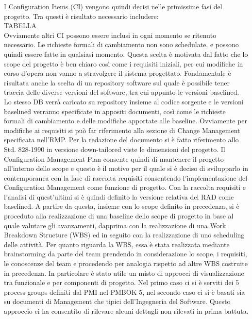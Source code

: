 I Configuration Items (CI) vengono quindi decisi nelle primissime fasi del progetto. Tra questi è risultato necessario includere: 
\\
TABELLA
\\
Ovviamente altri CI possono essere inclusi in ogni momento se ritenuto necessario.
Le richieste formali di cambiamento non sono schedulate, e possono quindi essere fatte in qualsiasi momento. Questa scelta è motivata dal fatto che lo scope del progetto è ben chiaro così come i requisiti iniziali, per cui modifiche in corso d’opera non vanno a stravolgere il sistema progettato.
Fondamentale è risultata anche la scelta di un repository software sul quale è possibile tener traccia delle diverse versioni del software, tra cui appunto le versioni baselined. Lo stesso DB verrà caricato su repository insieme al codice sorgente e le versioni baselined verranno specificate in appositi documenti, così come le richieste formali di cambiamento e delle modifiche apportate alle baseline.
Ovviamente per modifiche ai requisiti si può far riferimento alla sezione di Change Management specificata nell’RMP.
Per la redazione del documento si è fatto riferimento allo Std. 828-1990 in versione down-tailored viste le dimensioni del progetto.
Il Configuration Management Plan consente quindi di mantenere il progetto all’interno dello scope e questo è il motivo per il quale si è deciso di svilupparlo in contemporanea con la fase di raccolta requisiti consentendo l’implementazione del Configuration Management come funzione di progetto.
Con la raccolta requisiti e l’analisi di quest’ultimi si è quindi definito la versione relativa del RAD come baselined.
A partire da questa, insieme con lo scope definito in precedenza, si è proceduto alla realizzazione di una baseline dello scope di progetto in base al quale valutare gli avanzamenti, dapprima con la realizzazione di una Work Breakdown Structure (WBS) ed in seguito con la realizzazione di uno scheduling delle attività.
Per quanto riguarda la WBS, essa è stata realizzata mediante brainstorming da parte del team prendendo in considerazione lo scope, i requisiti, le conoscenze del team e procedendo per analogia rispetto ad altre WBS costruite in precedenza.
In particolare è stato utile un misto di approcci di visualizzazione tra funzionale e per componenti di progetto. Nel primo caso ci si è serviti dei 5 process groups definiti dal PMI nel PMBOK 5, nel secondo caso ci si è basati sia su documenti di Management che tipici dell’Ingegneria del Software.
Questo approccio ci ha consentito di rilevare alcuni dettagli non rilevati in prima battuta. 
